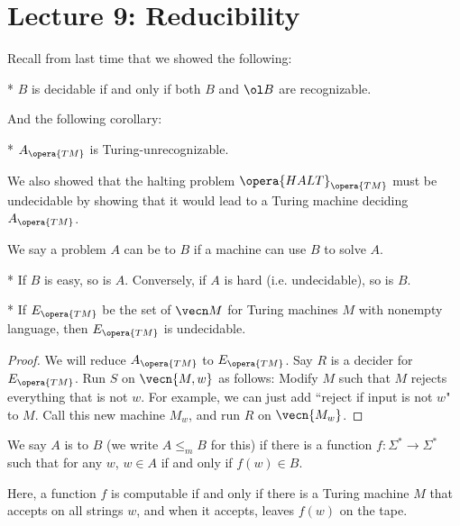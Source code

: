 \section*{Lecture 9: Reducibility}
\setcounter{section}{9}

Recall from last time that we showed the following:

\begin{thm}*
	$B$ is decidable if and only if both $B$ and $\ol B$ are recognizable.
\end{thm}

And the following corollary:

\begin{cor}*
	$A_{\opera{TM}}$ is Turing-unrecognizable.
\end{cor}

We also showed that the halting problem $\opera{HALT}_{\opera{TM}}$ must be undecidable by showing that it would lead to a Turing machine deciding $A_{\opera{TM}}$.

\begin{defn}
	We say a problem $A$ can be  to $B$ if a machine can use $B$ to solve $A$.
\end{defn}

\begin{fact}*
	If $B$ is easy, so is $A$. Conversely, if $A$ is hard (i.e. undecidable), so is $B$.
\end{fact}

\begin{thm}*
	If $E_{\opera{TM}}$ be the set of $\vecn M$ for Turing machines $M$ with nonempty language, then $E_{\opera{TM}}$ is undecidable.
\end{thm}

\begin{proof}
	We will reduce $A_{\opera{TM}}$ to $E_{\opera{TM}}$.
	Say $R$ is a decider for $E_{\opera{TM}}$.
	Run $S$ on $\vecn{M,w}$ as follows: Modify $M$ such that $M$ rejects everything that is not $w$.
	For example, we can just add ``reject if input is not $w$" to $M$.
	Call this new machine $M_w$, and run $R$ on $\vecn{M_w}$.
\end{proof}

\begin{defn}
	We say $A$ is  to $B$ (we write $A\leq_m B$ for this) if there is a  function $f\colon \Sigma^* \to \Sigma^*$ such that for any $w$, $w\in A$ if and only if $f(w)\in B$.
	
	Here, a function $f$ is computable if and only if there is a Turing machine $M$ that accepts on all strings $w$, and when it accepts, leaves $f(w)$ on the tape.
\end{defn}


